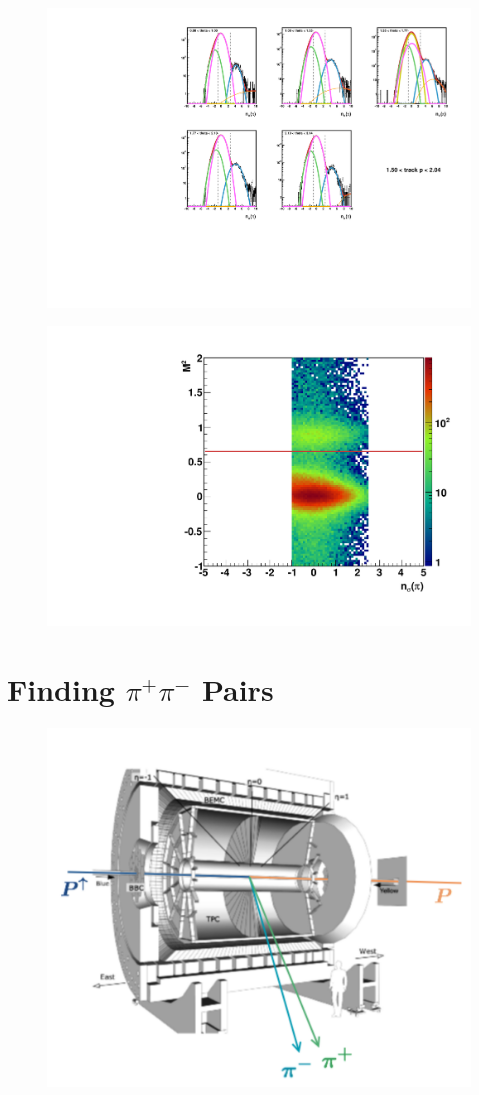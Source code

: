 \documentclass[abstract = on,listof=totoc, bibliography=totoc]{scrreprt}
\begin{document}
 \begin{figure}
\begin{center}
\includegraphics[width = .7\textwidth]{5gausFit_pbin_0.pdf}
\caption[]{}
\label{fig:5gaus0}
\end{center}
\end{figure}

 \begin{figure}
\begin{center}
\includegraphics[width = .7\textwidth]{tofPlot.pdf}
\caption[]{}
\label{fig:tofPlot}
\end{center}
\end{figure}





\section{Finding $\pi^+\pi^-$ Pairs}
\begin{figure}
\begin{center}
\includegraphics[width = .7\textwidth]{starPic6}
\caption[Schematic of Analysis]{}
\label{fig:analSchem}
\end{center}
\end{figure}
\end{document}
